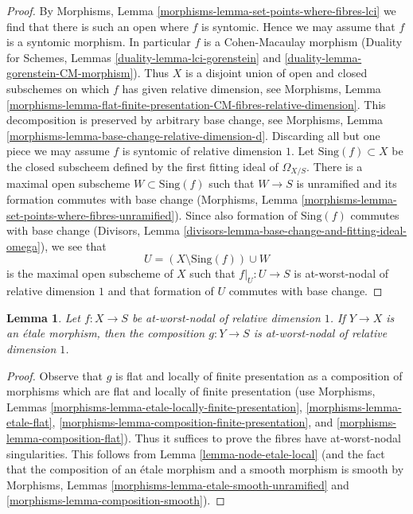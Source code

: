 \documentclass{stacks-project}
\theoremstyle{plain}
\newtheorem{lemma}[subsection]{Lemma}
\theoremstyle{definition}
\theoremstyle{remark}
\numberwithin{equation}{subsection}
\begin{document}
\begin{proof}
By Morphisms, Lemma \ref{morphisms-lemma-set-points-where-fibres-lci}
we find that there is such an open where $f$ is syntomic.
Hence we may assume that $f$ is a syntomic morphism.
In particular $f$ is a Cohen-Macaulay morphism
(Duality for Schemes, Lemmas \ref{duality-lemma-lci-gorenstein} and
\ref{duality-lemma-gorenstein-CM-morphism}).
Thus $X$ is a disjoint union of open and closed subschemes on which
$f$ has given relative dimension, see Morphisms, Lemma
\ref{morphisms-lemma-flat-finite-presentation-CM-fibres-relative-dimension}.
This decomposition is preserved by arbitrary base change, see
Morphisms, Lemma \ref{morphisms-lemma-base-change-relative-dimension-d}.
Discarding all but one piece we may assume $f$ is syntomic of
relative dimension $1$. Let $\text{Sing}(f) \subset X$ be the
closed subscheem defined by the first fitting ideal of
$\Omega_{X/S}$. There is a maximal open subscheme
$W \subset \text{Sing}(f)$ such that $W \to S$ is unramified
and its formation commutes with base change
(Morphisms, Lemma \ref{morphisms-lemma-set-points-where-fibres-unramified}).
Since also formation of $\text{Sing}(f)$ commutes with base change
(Divisors, Lemma
\ref{divisors-lemma-base-change-and-fitting-ideal-omega}),
we see that
$$
U = (X \setminus \text{Sing}(f)) \cup W
$$
is the maximal open subscheme of $X$ such that
$f|_U : U \to S$ is at-worst-nodal of relative dimension $1$
and that formation of $U$ commutes with base change.
\end{proof}

\begin{lemma}
\label{lemma-nodal-family-precompose-etale}
Let $f : X \to S$ be at-worst-nodal of relative dimension $1$.
If $Y \to X$ is an \'etale morphism, then the composition $g : Y \to S$
is at-worst-nodal of relative dimension $1$.
\end{lemma}

\begin{proof}
Observe that $g$ is flat and locally of finite presentation as
a composition of morphisms which are flat and locally of finite
presentation (use
Morphisms, Lemmas \ref{morphisms-lemma-etale-locally-finite-presentation},
\ref{morphisms-lemma-etale-flat},
\ref{morphisms-lemma-composition-finite-presentation}, and
\ref{morphisms-lemma-composition-flat}).
Thus it suffices to prove the fibres have at-worst-nodal singularities.
This follows from Lemma \ref{lemma-node-etale-local}
(and the fact that the composition of an \'etale morphism and
a smooth morphism is smooth by
Morphisms, Lemmas \ref{morphisms-lemma-etale-smooth-unramified} and
\ref{morphisms-lemma-composition-smooth}).
\end{proof}
\end{document}
